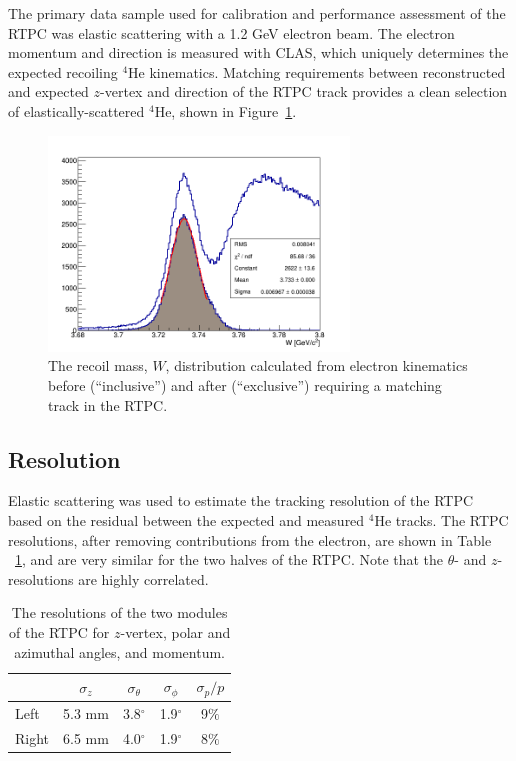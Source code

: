 \documentclass[preprint,5p]{elsarticle}
\begin{document}
The primary data sample used for calibration and performance assessment of the
RTPC was elastic scattering with a 1.2 GeV electron beam. The electron momentum
and direction is measured with CLAS, which uniquely determines the expected recoiling
$^4$He kinematics. Matching requirements between reconstructed and expected $z$-vertex
and direction of the RTPC track provides a clean selection of elastically-scattered
$^4$He, shown in Figure~\ref{fig:w}.

\begin{figure}[tb]\centering
  \includegraphics[width=8cm]{fit_W_distribution_l.png}
  \caption{The recoil mass, $W$, distribution calculated from electron 
  kinematics before (``inclusive'') and after (``exclusive'') requiring a 
  matching track in the RTPC.\label{fig:w}}
\end{figure}


\subsection{Resolution}

Elastic scattering was used to estimate the tracking resolution of the RTPC 
based on the residual between the expected and measured $^4$He tracks.  The RTPC
resolutions, after removing contributions from the electron, are shown in Table
~\ref{tab:reso}, and are very similar for the two halves of the RTPC.  Note that the
$\theta$- and $z$-resolutions are highly correlated.

\begin{table}[htbp]
\begin{center}
\begin{tabular}{|l|cccc|}
  \hline
& $\sigma_{z}$ &  $\sigma_{\theta}$ & $\sigma_{\phi}$ & $\sigma_{p}/p$\\
\hline
Left &  5.3 mm & 3.8$^{\circ}$ & 1.9$^{\circ}$ & 9$\%$ \\
Right & 6.5 mm & 4.0$^{\circ}$ & 1.9$^{\circ}$ & 8$\%$\\
\hline
\end{tabular}
\caption{The resolutions of the two modules of the RTPC for $z$-vertex, 
polar and azimuthal angles, and momentum.}
\label{tab:reso}
\end{center}
\end{table}
\end{document}
